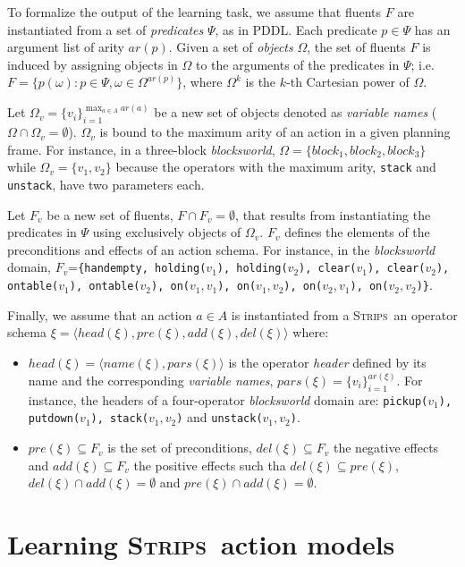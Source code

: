 \documentclass[letterpaper]{article} %
\newcommand{\tup}[1]{{\langle #1 \rangle}}
\newcommand{\strips}{\textsc{Strips}}     %
\begin{document}
To formalize the output of the learning task, we assume that fluents $F$ are instantiated from a set of {\em predicates} $\Psi$, as in PDDL. Each predicate $p\in\Psi$ has an argument list of arity $ar(p)$. Given a set of {\em objects} $\Omega$, the set of fluents $F$ is induced by assigning objects in $\Omega$ to the arguments of the predicates in $\Psi$; i.e.~$F=\{p(\omega):p\in\Psi,\omega\in\Omega^{ar(p)}\}$, where $\Omega^k$ is the $k$-th Cartesian power of $\Omega$.

Let $\Omega_v=\{v_i\}_{i=1}^{\operatorname*{max}_{a\in A} ar(a)}$ be a new set of objects denoted as {\em variable names} ($\Omega\cap\Omega_v=\emptyset$). $\Omega_v$ is bound to the maximum arity of an action in a given planning frame. For instance, in a three-block \emph{blocksworld}, $\Omega=\{block_1, block_2, block_3\}$ while $\Omega_v=\{v_1, v_2\}$ because the operators with the maximum arity, {\small\tt stack} and {\small\tt unstack}, have two parameters each.

Let $F_v$ be a new set of fluents, $F\cap F_v=\emptyset$, that results from instantiating the predicates in $\Psi$ using exclusively  objects of $\Omega_v$. $F_v$ defines the elements of the preconditions and effects of an action schema. For instance, in the \emph{blocksworld} domain, $F_v$={\small\tt\{handempty, holding($v_1$), holding($v_2$), clear($v_1$), clear($v_2$), ontable($v_1$), ontable($v_2$), on($v_1,v_1$), on($v_1,v_2$), on($v_2,v_1$), on($v_2,v_2$)\}}.

Finally, we assume that an action $a\in A$ is instantiated from a \strips\ an operator schema $\xi=\tup{head(\xi),pre(\xi),add(\xi),del(\xi)}$ where:

\begin{itemize}
\item $head(\xi)=\tup{name(\xi),pars(\xi)}$ is the operator {\em header} defined by its name and the corresponding {\em variable names}, $pars(\xi)=\{v_i\}_{i=1}^{ar(\xi)}$. For instance, the headers of a four-operator \emph{blocksworld} domain are: {\small\tt pickup($v_1$), putdown($v_1$), stack($v_1,v_2$)} and {\small\tt unstack($v_1,v_2$)}.
\item $pre(\xi)\subseteq F_v$ is the set of preconditions,  $del(\xi)\subseteq F_v$ the negative effects and  $add(\xi)\subseteq F_v$ the positive effects such tha $del(\xi)\subseteq pre(\xi)$, $del(\xi)\cap add(\xi)=\emptyset$ and $pre(\xi)\cap add(\xi)=\emptyset$.
\end{itemize}


\section{Learning \strips\ action models}
\end{document}
